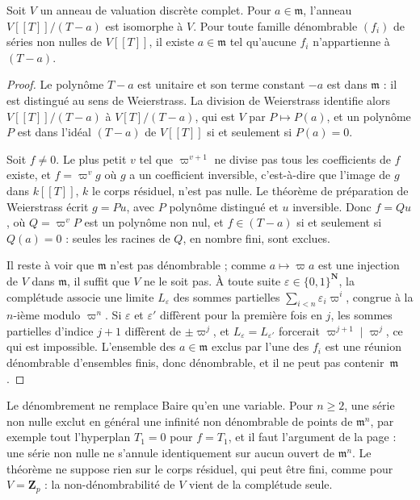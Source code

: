 \begin{encadre}
\begin{theoreme}[énoncé de l'édition, cas $n = 1$ du corollaire de la page 38\piste{100-baire-dimension-one-points}]\label{thm:100-points}
Soit $V$ un anneau de valuation discrète complet. Pour $a \in \mathfrak m$, l'anneau $V[[T]]/(T - a)$ est isomorphe à $V$. Pour toute famille dénombrable $(f_i)$ de séries non nulles de $V[[T]]$, il existe $a \in \mathfrak m$ tel qu'aucune $f_i$ n'appartienne à $(T - a)$.
\end{theoreme}
\end{encadre}

\begin{proof}
Le polynôme $T - a$ est unitaire et son terme constant $-a$ est dans $\mathfrak m$ : il est distingué au sens de Weierstrass. La division de Weierstrass identifie alors $V[[T]]/(T - a)$ à $V[T]/(T - a)$, qui est $V$ par $P \mapsto P(a)$, et un polynôme $P$ est dans l'idéal $(T - a)$ de $V[[T]]$ si et seulement si $P(a) = 0$.

Soit $f \neq 0$. Le plus petit $v$ tel que $\varpi^{v+1}$ ne divise pas tous les coefficients de $f$ existe, et $f = \varpi^v g$ où $g$ a un coefficient inversible, c'est-à-dire que l'image de $g$ dans $k[[T]]$, $k$ le corps résiduel, n'est pas nulle. Le théorème de préparation de Weierstrass écrit $g = P u$, avec $P$ polynôme distingué et $u$ inversible. Donc $f = Q u$, où $Q = \varpi^v P$ est un polynôme non nul, et $f \in (T - a)$ si et seulement si $Q(a) = 0$ : seules les racines de $Q$, en nombre fini, sont exclues.

Il reste à voir que $\mathfrak m$ n'est pas dénombrable ; comme $a \mapsto \varpi a$ est une injection de $V$ dans $\mathfrak m$, il suffit que $V$ ne le soit pas. À toute suite $\varepsilon \in \{0, 1\}^{\mathbf N}$, la complétude associe une limite $L_\varepsilon$ des sommes partielles $\sum_{i < n} \varepsilon_i \varpi^i$, congrue à la $n$-ième modulo $\varpi^n$. Si $\varepsilon$ et $\varepsilon'$ diffèrent pour la première fois en $j$, les sommes partielles d'indice $j + 1$ diffèrent de $\pm\varpi^j$, et $L_\varepsilon = L_{\varepsilon'}$ forcerait $\varpi^{j+1} \mid \varpi^j$, ce qui est impossible. L'ensemble des $a \in \mathfrak m$ exclus par l'une des $f_i$ est une réunion dénombrable d'ensembles finis, donc dénombrable, et il ne peut pas contenir~$\mathfrak m$.
\end{proof}

Le dénombrement ne remplace Baire qu'en une variable. Pour $n \geq 2$, une série non nulle exclut en général une infinité non dénombrable de points de $\mathfrak m^n$, par exemple tout l'hyperplan $T_1 = 0$ pour $f = T_1$, et il faut l'argument de la page : une série non nulle ne s'annule identiquement sur aucun ouvert de $\mathfrak m^n$. Le théorème ne suppose rien sur le corps résiduel, qui peut être fini, comme pour $V = \mathbf Z_p$ : la non-dénombrabilité de $V$ vient de la complétude seule.

